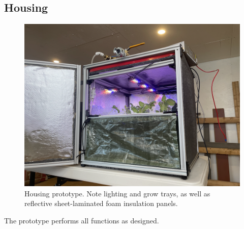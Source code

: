 \subsection{Housing}

\begin{figure}[h!]
  \centering
  \includegraphics[width=\textwidth]{../assets/photos/prototype_housing.png}
  \hfill
  \caption{Housing prototype. Note lighting and grow trays, as well as reflective sheet-laminated foam insulation panels.}
  \label{fig:prototype_housing}
\end{figure}

The prototype performs all functions as designed.